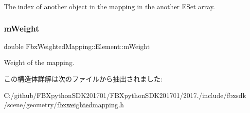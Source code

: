 The index of another object in the mapping in the another E\+Set array. 

\mbox{\label{struct_fbx_weighted_mapping_1_1_element_aa078b1f7b0a995f487530342dc9b0038}} 
\subsubsection{\texorpdfstring{m\+Weight}{mWeight}}
{\footnotesize\ttfamily double Fbx\+Weighted\+Mapping\+::\+Element\+::m\+Weight}



Weight of the mapping. 



この構造体詳解は次のファイルから抽出されました\+:\begin{DoxyCompactItemize}
\item 
C\+:/github/\+F\+B\+Xpython\+S\+D\+K201701/\+F\+B\+Xpython\+S\+D\+K201701/2017./include/fbxsdk/scene/geometry/\hyperlink{fbxweightedmapping_8h}{fbxweightedmapping.\+h}\end{DoxyCompactItemize}
